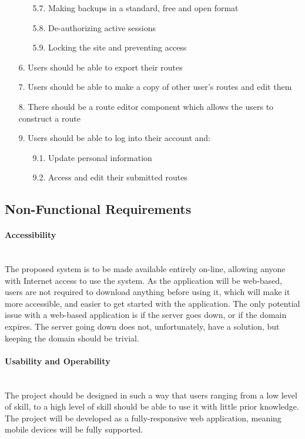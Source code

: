 \begin{enumerate}
\begin{enumerate}
 		\item[5.7.] Making backups in a standard, free and open format
 		\item[5.8.] De-authorizing active sessions
 		\item[5.9.] Locking the site and preventing access
 	\end{enumerate}
 \item[6.] Users should be able to export their routes
 \item[7.] Users should be able to make a copy of other user's routes and edit them
 \item[8.] There should be a route editor component which allows the users to construct a route
 \item[9.] Users should be able to log into their account and:
	 \begin{enumerate}
	 	\item[9.1.] Update personal information
	  	\item[9.2.] Access and edit their submitted routes
	 \end{enumerate}
 \end{enumerate}
 
\subsection{Non-Functional Requirements}
\label{sec:nfuncs}
\paragraph{Accessibility}\ \\
The proposed system is to be made available entirely on-line, allowing anyone with Internet access to use the system. As the application will be web-based, users are not required to download anything before using it, which will make it more accessible, and easier to get started with the application. The only potential issue with a web-based application is if the server goes down, or if the domain expires. The server going down does not, unfortunately, have a solution, but keeping the domain should be trivial.

\paragraph{Usability and Operability}\ \\
The project should be designed in such a way that users ranging from a low level of skill, to a high level of skill should be able to use it with little prior knowledge. The project will be developed as a fully-responsive web application, meaning mobile devices will be fully supported.

